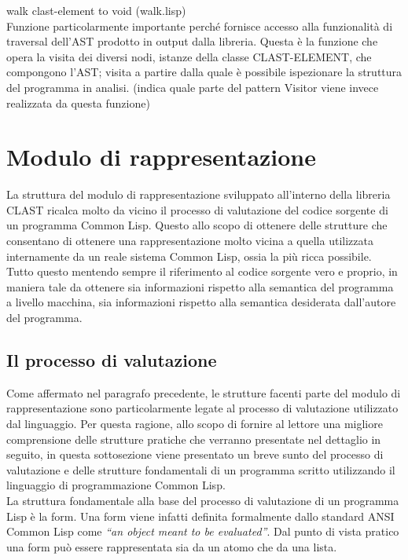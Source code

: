 walk clast-element to void (walk.lisp)\\

Funzione particolarmente importante perché fornisce accesso alla funzionalità di traversal dell'AST prodotto in output dalla libreria. Questa è la funzione che opera la visita dei diversi nodi, istanze della classe CLAST-ELEMENT, che compongono l'AST; visita a partire dalla quale è possibile ispezionare la struttura del programma in analisi. (indica quale parte del pattern Visitor viene invece realizzata da questa funzione)

\section{Modulo di rappresentazione}

La struttura del modulo di rappresentazione sviluppato all’interno della libreria CLAST ricalca molto da vicino il processo di valutazione del codice sorgente di un programma Common Lisp. Questo allo scopo di ottenere delle strutture che consentano di ottenere una rappresentazione molto vicina a quella utilizzata internamente da un reale sistema Common Lisp, ossia la più ricca possibile. Tutto questo mentendo sempre il riferimento al codice sorgente vero e proprio, in maniera tale da ottenere sia informazioni rispetto alla semantica del programma a livello macchina, sia informazioni rispetto alla semantica desiderata dall’autore del programma.

\subsection{Il processo di valutazione}

Come affermato nel paragrafo precedente, le strutture facenti parte del modulo di rappresentazione sono particolarmente legate al processo di valutazione utilizzato dal linguaggio. Per questa ragione, allo scopo di fornire al lettore una migliore comprensione delle strutture pratiche che verranno presentate nel dettaglio in seguito, in questa sottosezione viene presentato un breve sunto del processo di valutazione e delle strutture fondamentali di un programma scritto utilizzando il linguaggio di programmazione Common Lisp.\\

La struttura fondamentale alla base del processo di valutazione di un programma Lisp è la form. Una form viene infatti definita formalmente dallo standard ANSI Common Lisp come \textit{“an object meant to be evaluated”}. Dal punto di vista pratico una form può essere rappresentata sia da un atomo che da una lista.\\

